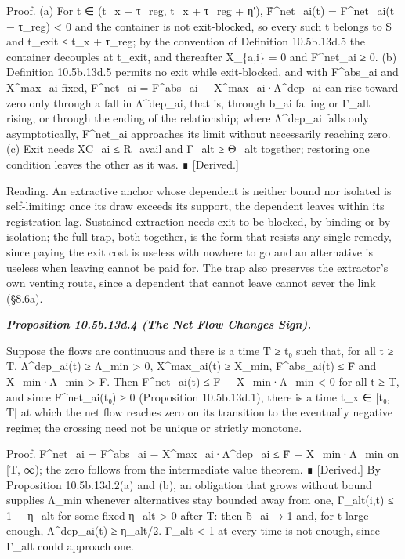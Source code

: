 \documentclass[
]{article}
\begin{document}
Proof. (a) For t ∈ (t\_x + τ\_reg, t\_x + τ\_reg + η′), F̂\^{}net\_ai(t)
= F\^{}net\_ai(t − τ\_reg) \textless{} 0 and the container is not
exit-blocked, so every such t belongs to S and t\_exit ≤ t\_x + τ\_reg;
by the convention of Definition 10.5b.13d.5 the container decouples at
t\_exit, and thereafter X\_\{a,i\} = 0 and F\^{}net\_ai ≥ 0. (b)
Definition 10.5b.13d.5 permits no exit while exit-blocked, and with
F\^{}abs\_ai and X\^{}max\_ai fixed, F\^{}net\_ai = F\^{}abs\_ai −
X\^{}max\_ai·Λ\^{}dep\_ai can rise toward zero only through a fall in
Λ\^{}dep\_ai, that is, through b\_ai falling or Γ\_alt rising, or
through the ending of the relationship; where Λ\^{}dep\_ai falls only
asymptotically, F\^{}net\_ai approaches its limit without necessarily
reaching zero. (c) Exit needs XC\_ai ≤ R\_avail and Γ\_alt ≥ Θ\_alt
together; restoring one condition leaves the other as it was. ∎
{[}Derived.{]}

Reading. An extractive anchor whose dependent is neither bound nor
isolated is self-limiting: once its draw exceeds its support, the
dependent leaves within its registration lag. Sustained extraction needs
exit to be blocked, by binding or by isolation; the full trap, both
together, is the form that resists any single remedy, since paying the
exit cost is useless with nowhere to go and an alternative is useless
when leaving cannot be paid for. The trap also preserves the extractor's
own venting route, since a dependent that cannot leave cannot sever the
link (§8.6a).

\emph{\textbf{Proposition 10.5b.13d.4 (The Net Flow Changes Sign).}}

Suppose the flows are continuous and there is a time T ≥ t₀ such that,
for all t ≥ T, Λ\^{}dep\_ai(t) ≥ Λ\_min \textgreater{} 0,
X\^{}max\_ai(t) ≥ X\_min, F\^{}abs\_ai(t) ≤ F̄ and X\_min·Λ\_min
\textgreater{} F̄. Then F\^{}net\_ai(t) ≤ F̄ − X\_min·Λ\_min \textless{} 0
for all t ≥ T, and since F\^{}net\_ai(t₀) ≥ 0 (Proposition 10.5b.13d.1),
there is a time t\_x ∈ {[}t₀, T{]} at which the net flow reaches zero on
its transition to the eventually negative regime; the crossing need not
be unique or strictly monotone.

Proof. F\^{}net\_ai = F\^{}abs\_ai − X\^{}max\_ai·Λ\^{}dep\_ai ≤ F̄ −
X\_min·Λ\_min on {[}T, ∞); the zero follows from the intermediate value
theorem. ∎ {[}Derived.{]} By Proposition 10.5b.13d.2(a) and (b), an
obligation that grows without bound supplies Λ\_min whenever
alternatives stay bounded away from one, Γ\_alt(i,t) ≤ 1 − η\_alt for
some fixed η\_alt \textgreater{} 0 after T: then b̃\_ai → 1 and, for t
large enough, Λ\^{}dep\_ai(t) ≥ η\_alt/2. Γ\_alt \textless{} 1 at every
time is not enough, since Γ\_alt could approach one.
\end{document}
